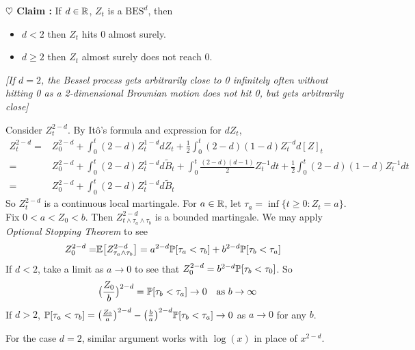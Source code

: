 \documentclass[12pt,a4paper]{article}
\newenvironment{proof}
{\begin{changemargin}{0.5cm}{0.5cm} 
	}%
	{\end{changemargin}
}
\renewenvironment{i}
{\begin{itemize} 
	}%
	{\end{itemize}
}
\newenvironment{p}
{\begin{proof} 
	}%
	{\end{proof}
}
\begin{document}
\textbf{$\heartsuit$ Claim :} If $d\in \mathbb{R}$, $Z_t$ is a $\text{BES}^d$, then
\begin{i}
\item $d<2$ then $Z_t$ hits 0 almost surely.
\item $d\geq 2$ then $Z_t$ almost surely does not reach 0.
\end{i}
\emph{[If $d=2$, the Bessel process gets arbitrarily close to 0 infinitely often without hitting 0 as a 2-dimensional Brownian motion does not hit 0, but gets arbitrarily close]}
\begin{p}
\pf Consider $Z_t^{2-d}$. By It\^o's formula and expression for $dZ_t$,
\begin{align*}
Z_t^{2-d} =& Z_0^{2-d} + \int_0^t (2-d) Z_t^{1-d} dZ_t + \frac{1}{2} \int_0^t (2-d)(1-d) Z_t^{-d} d[Z]_t \\
=& Z_0^{2-d} + \int_0^t (2-d) Z_t^{1-d} d\tilde{B}_t +\int_0^t \frac{(2-d)(d-1)}{2} Z_t^{-1} dt + \frac{1}{2} \int_0^t (2-d)(1-d) Z_t^{-1} dt \\
=& Z_0^{2-d} + \int_0^t (2-d) Z_t^{1-d} d\tilde{B}_t
\end{align*}
So $Z_t^{2-d}$ is a continuous local martingale. For $a\in \mathbb{R}$, let $\tau_a = \inf \{ t\geq 0: Z_t =a\}$. Fix $0< a< Z_0 <b$. Then $Z^{2-d}_{t\wedge \tau_a \wedge \tau_b}$ is a bounded martingale. We may apply \emph{Optional Stopping Theorem} to see
\begin{align*}
Z_0^{2-d} =& \mathbb{E} \big[ Z_{\tau_a \wedge \tau_b}^{2-d} \big] = a^{2-d} \mathbb{P} [\tau_a < \tau_b] + b^{2-d} \mathbb{P}[\tau_b < \tau_a] 
\end{align*}
If $d<2$, take a limit as $a\rightarrow 0$ to see that $Z_0^{2-d}= b^{2-d} \mathbb{P} [\tau_b < \tau_0]$. So
\begin{align*}
\big( \frac{Z_0}{b} \big)^{2-d} = \mathbb{P} [\tau_b < \tau_a] \rightarrow 0 \quad \text{as } b\rightarrow \infty
\end{align*}
If $d>2$, $\mathbb{P} [\tau_a < \tau_b] = \big( \frac{Z_0}{a} \big)^{2-d} - \big( \frac{b}{a} \big)^{2-d} \mathbb{P} [\tau _b < \tau_a] \rightarrow 0$ as $a\rightarrow 0$ for any $b$.
\s

For the case $d=2$, similar argument works with $\log(x)$ in place of $x^{2-d}$.

\eop
\end{p}
\s
\end{document}
